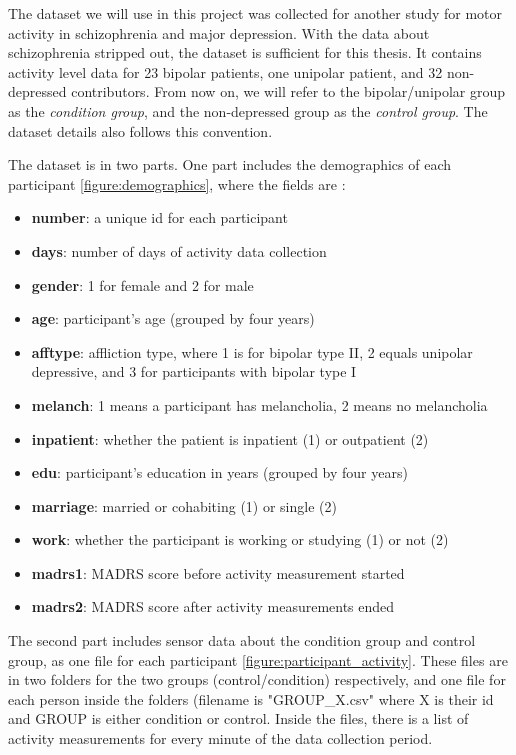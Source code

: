 The dataset we will use in this project \cite{dataset} was collected for another study for motor activity in schizophrenia and major depression. With the data about schizophrenia stripped out, the dataset is sufficient for this thesis. It contains activity level data for 23 bipolar patients, one unipolar patient, and 32 non-depressed contributors. From now on, we will refer to the bipolar/unipolar group as the \textit{condition group}, and the non-depressed group as the \textit{control group}. The dataset details \cite{dataset_details} also follows this convention.

The dataset is in two parts. One part includes the demographics of each participant \ref{figure:demographics}, where the fields are \cite{dataset_details}:

\begin{itemize}
    \item \textbf{number}: a unique id for each participant
    \item \textbf{days}: number of days of activity data collection 
    \item \textbf{gender}: 1 for female and 2 for male
    \item \textbf{age}: participant's age (grouped by four years)
    \item \textbf{afftype}: affliction type, where 1 is for bipolar type II, 2 equals unipolar depressive, and 3 for participants with bipolar type I
    \item \textbf{melanch}: 1 means a participant has melancholia, 2 means no melancholia
    \item \textbf{inpatient}: whether the patient is inpatient (1) or outpatient (2)
    \item \textbf{edu}: participant's education in years (grouped by four years)
    \item \textbf{marriage}: married or cohabiting (1) or single (2)
    \item \textbf{work}: whether the participant is working or studying (1) or not (2)
    \item \textbf{madrs1}: MADRS score before activity measurement started
    \item \textbf{madrs2}: MADRS score after activity measurements ended
\end{itemize}

The second part includes sensor data about the condition group and control group, as one file for each participant \ref{figure:participant_activity}. These files are in two folders for the two groups (control/condition) respectively, and one file for each person inside the folders (filename is "GROUP\_X.csv" where X is their id and GROUP is either condition or control. Inside the files, there is a list of activity measurements for every minute of the data collection period.

